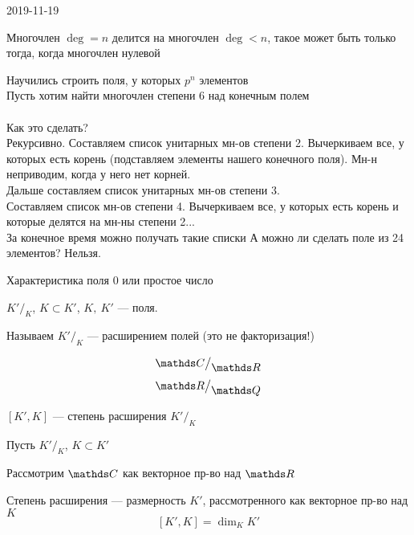 \documentclass[main.tex]{subfiles}
\begin{document}
\begin{lect}{2019-11-19}
\begin{Proof}
\begin{enumerate}
        Многочлен $\deg = n$ делится на многочлен $\deg < n$, такое может быть только тогда,
        когда многочлен нулевой
      \end{enumerate}
      Научились строить поля, у которых $p^n$ элементов\\
      Пусть хотим найти многочлен степени 6 над конечным полем\\ \ \\
      Как это сделать?\\
      Рекурсивно. Составляем список унитарных мн-ов степени 2. Вычеркиваем все, у которых есть корень (подставляем элементы нашего конечного поля). Мн-н неприводим, когда у него нет корней.\\
      Дальше составляем список унитарных мн-ов степени 3.\\
      Составляем список мн-ов степени 4. Вычеркиваем все,
      у которых есть корень и которые делятся на мн-ны степени 2...\\
      За конечное время можно получать такие списки
      А можно ли сделать поле из 24 элементов? Нельзя.

      \begin{reminder}
          Характеристика поля 0 или простое число
      \end{reminder}

      \begin{definition}
          $K'\big/_{\displaystyle K}$, $K \subset K'$, $K,\ K'$ --- поля.

          Называем $K'\big/_{\displaystyle K}$ --- расширением полей (это не факторизация!)
      \end{definition}

      \begin{Example}
          \[\CC\big/_{\displaystyle \R}\]
          \[\R\big/_{\displaystyle \Q}\]
      \end{Example}

      \begin{definition}
          $[K', K]$ --- степень расширения $K'\big/_{\displaystyle K}$
      \end{definition}

      Пусть $K'\big/_{\displaystyle K}$, $K \subset K'$

      Рассмотрим $\CC$ как векторное пр-во над $\R$

      \begin{remark}
          Степень расширения --- размерность $K'$, рассмотренного как векторное пр-во над $K$
          \[[K',K] = \dim_K K'\]
      \end{remark}


\end{Proof}
\end{lect}
\end{document}
